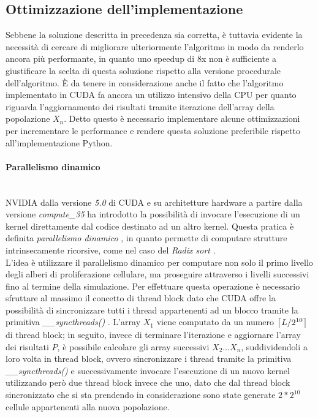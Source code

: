 \subsection{Ottimizzazione dell'implementazione}

Sebbene la soluzione descritta in precedenza sia corretta, è tuttavia
evidente la necessità di cercare di migliorare ulteriormente
l'algoritmo in modo da renderlo ancora più performante, in quanto uno
speedup di 8x non è sufficiente a giustificare la scelta di questa soluzione
rispetto alla versione procedurale dell'algoritmo.
È da tenere in considerazione anche il fatto che l'algoritmo implementato
in CUDA fa ancora un utilizzo intensivo della CPU per quanto riguarda
l'aggiornamento dei risultati tramite iterazione dell'array della
popolazione $X_{n}$.
Detto questo è necessario implementare alcune ottimizzazioni per
incrementare le performance e rendere questa soluzione preferibile rispetto
all'implementazione Python.

\paragraph{Parallelismo dinamico}\mbox{}
\\
NVIDIA dalla versione \textit{5.0} di CUDA e su architetture hardware a partire
dalla versione \textit{compute\_35} ha introdotto la possibilità di invocare
l'esecuzione di un kernel direttamente dal codice destinato ad un altro kernel.
Questa pratica è definita
\textit{parallelismo dinamico} \cite{jones2012introduction}, in quanto permette
di computare strutture intrinsecamente ricorsive, come nel caso del
\textit{Radix sort} \cite{merrill2011high}.
\\
L'idea è utilizzare il parallelismo dinamico per computare non solo il primo
livello degli alberi di proliferazione cellulare, ma proseguire attraverso i
livelli successivi fino al termine della simulazione.
Per effettuare questa operazione è necessario sfruttare al massimo il concetto di
thread block dato che CUDA offre la possibilità di sincronizzare
tutti i thread appartenenti ad un blocco tramite la primitiva
\textit{\_\_syncthreads()} \cite{jones2012introduction}.
L'array $X_{1}$ viene computato da un numero $\ceil*{L/2^{10}}$ di thread 
block; in seguito, invece di terminare l'iterazione e aggiornare l'array dei 
risultati $P$, è possibile calcolare gli array successivi $X_{2} \dots X_{n}$,
suddividendoli a loro volta in thread block, ovvero sincronizzare i thread 
tramite la primitiva \textit{\_\_syncthreads()} e successivamente invocare 
l'esecuzione di un nuovo kernel utilizzando però due thread block invece che 
uno, dato che dal thread block sincronizzato che si sta prendendo in 
considerazione sono state generate $2 * 2^{10}$ cellule appartenenti alla 
nuova popolazione.

